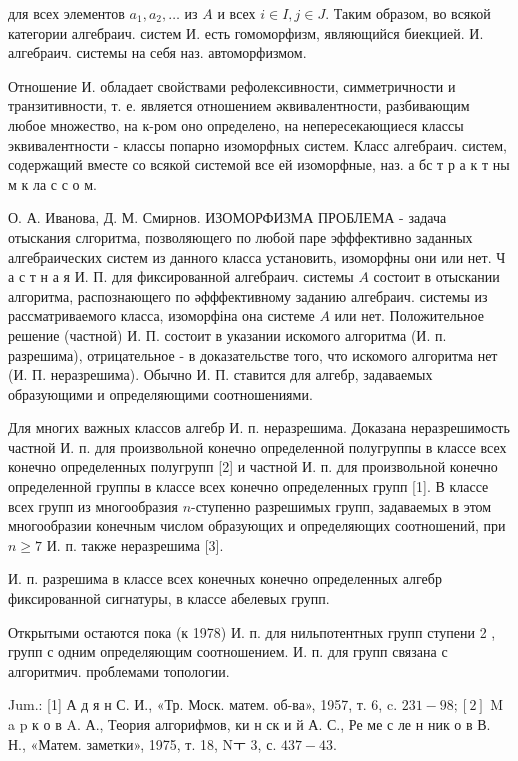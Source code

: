 \documentclass[10pt]{article}
\begin{document}
для всех элементов $a_{1}, a_{2}, \ldots$ из $A$ и всех $i \in I, j \in J$. Таким образом, во всякой категории алгебраич. систем И. есть гомоморфизм, являющийся биекцией. И. алгебраич. системы на себя наз. автоморфизмом.



Отношение И. обладает свойствами рефолексивности, симметричности и транзитивности, т. е. является отношением әквивалентности, разбивающим любое множество, на к-ром оно определено, на непересекающиеся классы эквивалентности - классы попарно изоморфных систем. Класс алгебраич. систем, содержащий вместе со всякой системой все ей изоморфные, наз. а бс т р а к т ны м к ла с с о м.



О. А. Иванова, Д. М. Смирнов. ИЗОМОРФИЗМА ПРОБЛЕМА - задача отыскания слгоритма, позволяющего по любой паре эфффективно заданных алгебраических систем из данного класса установить, изоморфны они или нет. Ч а с т н а я И. П. для фиксированной алгебраич. системы $A$ состоит в отыскании алгоритма, распознающего по әфффективному заданию алгебраич. системы из рассматриваемого класса, изоморфіна она системе $A$ или нет. Положительное решение (частной) И. П. состоит в указании искомого алгоритма (И. п. разрешима), отрицательное - в доказательстве того, что искомого алгоритма нет (И. П. неразрешима). Обычно И. П. ставится для алгебр, задаваемых образующими и определяющими соотношениями.



Для многих важных классов алгебр И. п. неразрешима. Доказана неразрешимость частной И. п. для произвольной конечно определенной полугруппы в классе всех конечно определенных полугрупп [2] и частной И. п. для произвольной конечно определенной группы в классе всех конечно определенных групп [1]. В классе всех групп из многообразия $n$-ступенно разрешимых групп, задаваемых в этом многообразии конечным числом образующих и определяющих соотношений, при $n \geqslant 7$ И. п. также неразрешима [3].



И. п. разрешима в классе всех конечных конечно определенных алгебр фиксированной сигнатуры, в классе абелевых групп.



Открытыми остаются пока (к 1978) И. п. для нильпотентных групп ступени 2 , групп с одним определяющим соотношением. И. п. для групп связана с алгоритмич. проблемами топологии.



Jum.: [1] А д я н С. И., «Тр. Моск. матем. об-ва», 1957, т. 6, c. $231-98 ;[2]$ M a p к о в A. А., Теория алгорифмов, ки н ск и й А. С., Ре ме с ле н ник о в В. Н., «Матем. заметки», 1975, т. 18, Nㅜ 3, с. $437-43$.
\end{document}
